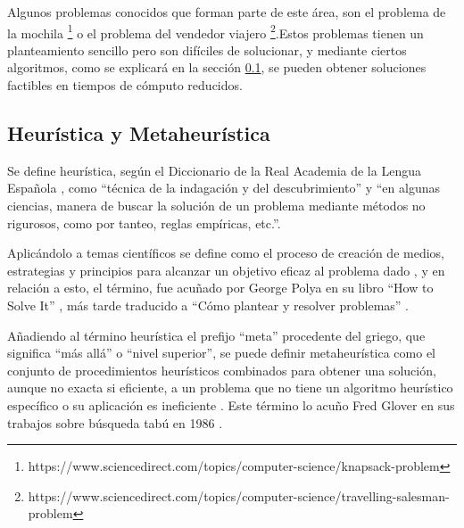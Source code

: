 Algunos problemas conocidos que forman parte de este área, son el problema de la mochila \footnote{https://www.sciencedirect.com/topics/computer-science/knapsack-problem} o el problema del vendedor viajero \footnote{https://www.sciencedirect.com/topics/computer-science/travelling-salesman-problem}.Estos problemas tienen un planteamiento sencillo pero son difíciles de solucionar, y mediante ciertos algoritmos, como se explicará en la sección \ref{sec:heu-meta}, se pueden obtener soluciones factibles en tiempos de cómputo reducidos.

\subsection{Heurística y Metaheurística}
\label{sec:heu-meta}
Se define heurística, según el Diccionario de la Real Academia de la Lengua Española \cite{rae-heuristica}, como ``técnica de la indagación y del descubrimiento'' y ``en algunas ciencias, manera de buscar la solución de un problema mediante métodos no rigurosos, como por tanteo, reglas empíricas, etc.''.

Aplicándolo a temas científicos se define como el proceso de creación de medios, estrategias y principios para alcanzar un objetivo eficaz al problema dado \cite{conceptodef-heuristica}, y en relación a esto, el término, fue acuñado por George Polya en su libro ``How to Solve It'' \cite{gpolya-book-1}, más tarde traducido a ``Cómo plantear y resolver problemas'' \cite{gpolya-book-2}.

Añadiendo al término heurística el prefijo ``meta'' procedente del griego, que significa ``más allá'' o ``nivel superior'', se puede definir metaheurística como el conjunto de procedimientos heurísticos combinados para obtener una solución, aunque no exacta si eficiente, a un problema que no tiene un algoritmo heurístico específico o su aplicación es ineficiente \cite{wiki-metaheuristica}. Este término lo acuño Fred Glover en sus trabajos sobre búsqueda tabú en 1986 \cite{fred-glover}.

